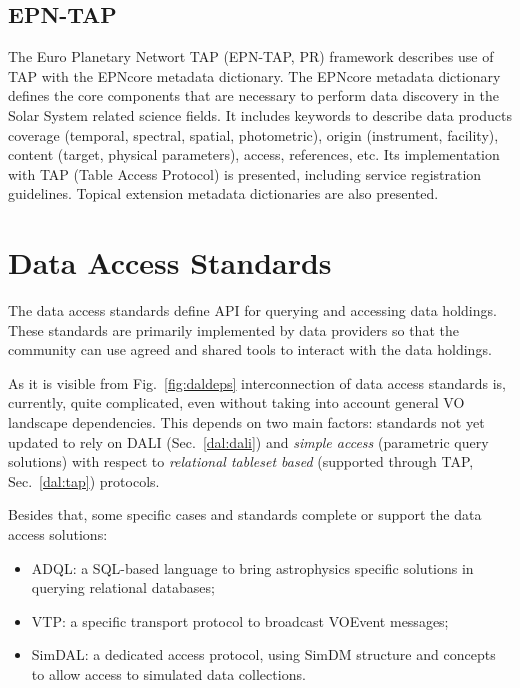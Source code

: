 \documentclass[11pt,a4paper]{ivoa}
\begin{document}
\subsection{EPN-TAP}

The Euro Planetary Networt TAP (EPN-TAP, PR) framework describes use of TAP with the EPNcore metadata dictionary. The EPNcore 
metadata dictionary defines the core components that are necessary to perform data discovery 
in the Solar System related science fields. It includes keywords to describe data products 
coverage (temporal, spectral, spatial, photometric), origin (instrument, facility), content 
(target, physical parameters), access, references, etc. Its implementation with TAP (Table 
Access Protocol) is presented, including service registration guidelines. Topical extension 
metadata dictionaries are also presented. 

\section{Data Access Standards}

The data access standards define API for querying and accessing data holdings.
These standards are primarily implemented by data providers so that the community 
can use agreed and shared tools to interact with the data holdings.

As it is visible from Fig.~\ref{fig:daldeps} interconnection of data
access standards is, currently, quite complicated, even without taking
into account general VO landscape dependencies. This depends on two main
factors: standards not yet updated to rely on DALI (Sec.~\ref{dal:dali})
and \textit{simple access} (parametric query solutions) with respect to
\textit{relational tableset based} (supported through TAP, Sec.~\ref{dal:tap}) 
protocols.

Besides that, some specific cases and standards complete or support the
data access solutions:
\begin{itemize}
	\item ADQL: a SQL-based language to bring astrophysics specific
solutions in querying relational databases;
	\item VTP: a specific transport protocol to broadcast VOEvent
messages;
	\item SimDAL: a dedicated access protocol, using SimDM structure and
concepts to allow access to simulated data collections.
\end{itemize}
\end{document}
